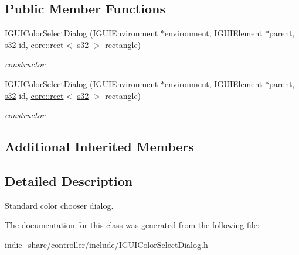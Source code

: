 \subsection*{Public Member Functions}
\begin{DoxyCompactItemize}
\item 
\mbox{\label{classirr_1_1gui_1_1IGUIColorSelectDialog_a67ac184f6dc90f74a2694015b02e3acd}} 
\hyperlink{classirr_1_1gui_1_1IGUIColorSelectDialog_a67ac184f6dc90f74a2694015b02e3acd}{I\+G\+U\+I\+Color\+Select\+Dialog} (\hyperlink{classirr_1_1gui_1_1IGUIEnvironment}{I\+G\+U\+I\+Environment} $\ast$environment, \hyperlink{classirr_1_1gui_1_1IGUIElement}{I\+G\+U\+I\+Element} $\ast$parent, \hyperlink{namespaceirr_ac66849b7a6ed16e30ebede579f9b47c6}{s32} id, \hyperlink{classirr_1_1core_1_1rect}{core\+::rect}$<$ \hyperlink{namespaceirr_ac66849b7a6ed16e30ebede579f9b47c6}{s32} $>$ rectangle)
\begin{DoxyCompactList}\small\item\em constructor \end{DoxyCompactList}\item 
\mbox{\label{classirr_1_1gui_1_1IGUIColorSelectDialog_a67ac184f6dc90f74a2694015b02e3acd}} 
\hyperlink{classirr_1_1gui_1_1IGUIColorSelectDialog_a67ac184f6dc90f74a2694015b02e3acd}{I\+G\+U\+I\+Color\+Select\+Dialog} (\hyperlink{classirr_1_1gui_1_1IGUIEnvironment}{I\+G\+U\+I\+Environment} $\ast$environment, \hyperlink{classirr_1_1gui_1_1IGUIElement}{I\+G\+U\+I\+Element} $\ast$parent, \hyperlink{namespaceirr_ac66849b7a6ed16e30ebede579f9b47c6}{s32} id, \hyperlink{classirr_1_1core_1_1rect}{core\+::rect}$<$ \hyperlink{namespaceirr_ac66849b7a6ed16e30ebede579f9b47c6}{s32} $>$ rectangle)
\begin{DoxyCompactList}\small\item\em constructor \end{DoxyCompactList}\end{DoxyCompactItemize}
\subsection*{Additional Inherited Members}


\subsection{Detailed Description}
Standard color chooser dialog. 

The documentation for this class was generated from the following file\+:\begin{DoxyCompactItemize}
\item 
indie\+\_\+share/controller/include/I\+G\+U\+I\+Color\+Select\+Dialog.\+h\end{DoxyCompactItemize}
